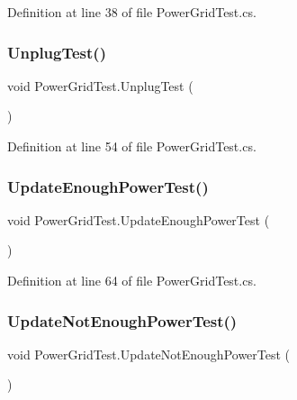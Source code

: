 Definition at line 38 of file Power\+Grid\+Test.\+cs.

\mbox{\label{class_power_grid_test_a1b6bca613cc9a652c43669953803dd68}} 
\subsubsection{\texorpdfstring{Unplug\+Test()}{UnplugTest()}}
{\footnotesize\ttfamily void Power\+Grid\+Test.\+Unplug\+Test (\begin{DoxyParamCaption}{ }\end{DoxyParamCaption})}



Definition at line 54 of file Power\+Grid\+Test.\+cs.

\mbox{\label{class_power_grid_test_ac2834264374318ac4c976af94542efea}} 
\subsubsection{\texorpdfstring{Update\+Enough\+Power\+Test()}{UpdateEnoughPowerTest()}}
{\footnotesize\ttfamily void Power\+Grid\+Test.\+Update\+Enough\+Power\+Test (\begin{DoxyParamCaption}{ }\end{DoxyParamCaption})}



Definition at line 64 of file Power\+Grid\+Test.\+cs.

\mbox{\label{class_power_grid_test_a3a8fc8ddd17a7bffc9b159b0485be944}} 
\subsubsection{\texorpdfstring{Update\+Not\+Enough\+Power\+Test()}{UpdateNotEnoughPowerTest()}}
{\footnotesize\ttfamily void Power\+Grid\+Test.\+Update\+Not\+Enough\+Power\+Test (\begin{DoxyParamCaption}{ }\end{DoxyParamCaption})}



